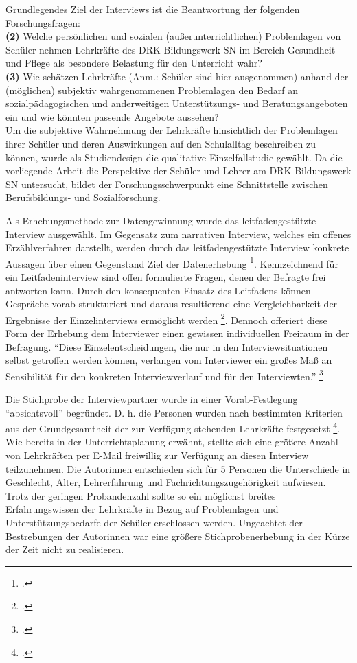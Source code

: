 \noindent
Grundlegendes Ziel der Interviews ist die Beantwortung der folgenden Forschungsfragen:\\

\noindent
\textbf{(2)} Welche persönlichen und sozialen (außerunterrichtlichen) Problemlagen von Schüler nehmen Lehrkräfte des DRK Bildungswerk SN im Bereich Gesundheit und Pflege als besondere Belastung für den Unterricht wahr?\\

\noindent
\textbf{(3)} Wie schätzen Lehrkräfte (Anm.: Schüler sind hier ausgenommen) anhand der (möglichen) subjektiv wahrgenommenen Problemlagen den Bedarf an sozialpädagogischen und anderweitigen Unterstützungs- und Beratungsangeboten ein und wie könnten passende Angebote aussehen?\\

\noindent
Um die subjektive Wahrnehmung der Lehrkräfte hinsichtlich der Problemlagen ihrer Schüler und deren Auswirkungen auf den Schulalltag beschreiben zu können, wurde als Studiendesign die qualitative Einzelfallstudie gewählt. Da die vorliegende Arbeit die Perspektive der Schüler und Lehrer am DRK Bildungswerk SN untersucht, bildet der Forschungsschwerpunkt eine Schnittstelle zwischen Berufsbildungs- und Sozialforschung.

Als Erhebungsmethode zur Datengewinnung wurde das leitfadengestützte Interview ausgewählt. Im Gegensatz zum narrativen Interview, welches ein offenes Erzählverfahren darstellt, werden durch das leitfadengestützte Interview konkrete Aussagen über einen Gegenstand Ziel der Datenerhebung \footcite[vgl.][37]{Mayer2013}. Kennzeichnend für ein Leitfadeninterview sind offen formulierte Fragen, denen der Befragte frei antworten kann. Durch den konsequenten Einsatz des Leitfadens können Gespräche vorab strukturiert und daraus resultierend eine Vergleichbarkeit der Ergebnisse der Einzelinterviews ermöglicht werden \footcites[vgl.][112]{Flick1999}[vgl.][376f]{Friebertshaeuser1997}. Dennoch offeriert diese Form der Erhebung dem Interviewer einen gewissen individuellen  Freiraum in der Befragung. "`Diese Einzelentscheidungen, die nur in den Interviewsituationen selbst getroffen werden können, verlangen vom Interviewer ein großes Maß an Sensibilität für den konkreten Interviewverlauf und für den Interviewten."' \footcite[113]{Flick1999} 

Die Stichprobe der Interviewpartner wurde in einer Vorab-Festlegung "`absichtsvoll"' begründet. D. h. die Personen wurden nach bestimmten Kriterien aus der Grundgesamtheit der zur Verfügung stehenden Lehrkräfte festgesetzt \footcite[vgl.][39]{Mayer2013}. Wie bereits in der Unterrichtsplanung erwähnt, stellte sich eine größere Anzahl von Lehrkräften per E-Mail freiwillig zur Verfügung an diesen Interview teilzunehmen. Die Autorinnen entschieden sich für 5 Personen die Unterschiede in Geschlecht, Alter, Lehrerfahrung und Fachrichtungszugehörigkeit aufwiesen. Trotz der geringen Probandenzahl sollte so ein möglichst breites Erfahrungswissen der Lehrkräfte in Bezug auf Problemlagen und Unterstützungsbedarfe der Schüler erschlossen werden. Ungeachtet der Bestrebungen der Autorinnen war eine größere Stichprobenerhebung in der Kürze der Zeit nicht zu realisieren.


